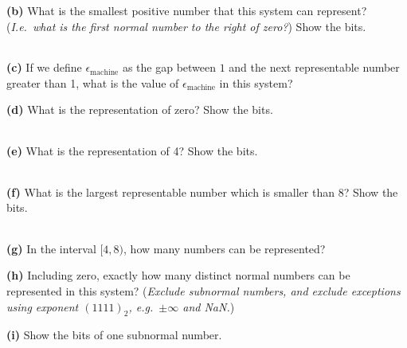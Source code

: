 \documentclass[12pt]{amsart}
\newcommand{\eps}{\epsilon}
\newcommand{\epart}[1]{\bigskip\noindent\textbf{(#1)}\quad }
\newcommand{\bitboxes}{
\large
\begin{center}
\begin{tabular}{|c|c|c|c|c|c|c|c|c|c|c|c|} \hline
\phantom{$e_1$} &
\phantom{$e_1$} &
\phantom{$e_1$} &
\phantom{$e_1$} &
\phantom{$e_1$} &
\phantom{$e_1$} &
\phantom{$e_1$} &
\phantom{$e_1$} &
\phantom{$e_1$} &
\phantom{$e_1$} &
\phantom{$e_1$} &
\phantom{$e_1$} \\ \hline
\end{tabular}
\end{center}
\normalsize}
\begin{document}
\epart{b}  What is the smallest positive number that this system can represent?  (\emph{I.e.~what is the first normal number to the right of zero?})  Show the bits.

\bitboxes
\vfill

\epart{c}  If we define $\eps_{\text{machine}}$ as the gap between $1$ and the next representable number greater than 1, what is the value of $\eps_{\text{machine}}$ in this system?
\vfill

\newpage
\epart{d}  What is the representation of zero?  Show the bits.

\bitboxes
\vfill

\epart{e}  What is the representation of 4?  Show the bits.

\bitboxes
\vfill

\epart{f}  What is the largest representable number which is smaller than 8?  Show the bits.

\bitboxes
\vfill

\epart{g}  In the interval $[4,8)$, how many numbers can be represented?
\vfill

\epart{h}  Including zero, exactly how many distinct normal numbers can be represented in this system?  (\emph{Exclude subnormal numbers, and exclude exceptions using exponent $(1111)_2$, e.g.~$\pm\infty$ and NaN.})
\vfill

\epart{i}  Show the bits of one subnormal number.

\bitboxes
\vspace{0.6in}
\end{document}
